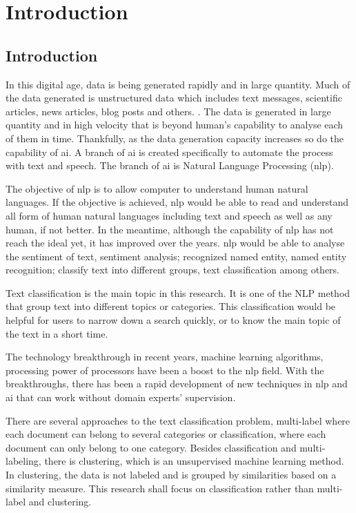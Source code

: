 \chapter{Introduction}
\section{Introduction}
In this digital age, data is being generated rapidly and in large quantity. Much of the data generated is unstructured data which includes text messages, scientific articles, news articles, blog posts and others. \cite{bigData}. The data is generated in large quantity and in high velocity that is beyond human's capability to analyse each of them in time. Thankfully, as the data generation capacity increases so do the capability of \ac{ai}. A branch of \ac{ai} is created specifically to automate the process with text and speech. The branch of \ac{ai} is Natural Language Processing (\ac{nlp}).

The objective of \ac{nlp} is to allow computer to understand human natural languages. If the objective is achieved, \ac{nlp} would be able to read and understand all form of human natural languages including text  and speech as well as any human, if not better. In the meantime, although the capability of \ac{nlp} has not reach the ideal yet, it has improved over the years. \Ac{nlp} would be able to analyse the sentiment of text, sentiment analysis; recognized named entity, named entity recognition; classify text into different groups, text classification among others.

Text classification is the main topic in this research. It is one of the NLP method that group text into different topics or categories. This classification would be helpful for users to narrow down a search quickly, or to know the main topic of the text in a short time.

The technology breakthrough in recent years, machine learning algorithms, processing power of processors have been a boost to the \ac{nlp} field. With the breakthroughs, there has been a rapid development of new techniques in \ac{nlp} and \ac{ai} that can work without domain experts' supervision.

There are several approaches to the text classification problem, multi-label where each document can belong to several categories or classification, where each document can only belong to one category. Besides classification and multi-labeling, there is clustering, which is an unsupervised machine learning method. In clustering, the data is not labeled and is grouped by similarities based on a similarity measure. This research shall focus on classification rather than multi-label and clustering.

